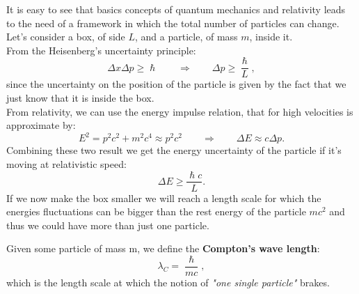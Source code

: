 It is easy to see that basics concepts of quantum mechanics and relativity leads to the need of a framework in which the total number of particles can change.\\Let's consider a box, of side $L$, and a particle, of mass $m$, inside it.\\From the Heisenberg's uncertainty principle:
\begin{equation*}
    \Delta x\Delta p\geq\hslash\qquad\Rightarrow\qquad\Delta p\geq\frac{\hslash}{L},
\end{equation*}
since the uncertainty on the position of the particle is given by the fact that we just know that it is inside the box.\\From relativity, we can use the energy impulse relation, that for high velocities is approximate by:
\begin{equation*}
    E^2=p^2c^2+m^2c^4\approx p^2c^2\qquad \Rightarrow \qquad \Delta E\approx c\Delta p.
\end{equation*}
Combining these two result we get the energy uncertainty of the particle if it's moving at relativistic speed:
\begin{equation*}
    \Delta E \geq \frac{\hslash c}{L}.
\end{equation*}
If we now make the box smaller we will reach a length scale for which the energies fluctuations can be bigger than the rest energy of the particle $mc^2$ and thus we could have more than just one particle.
\begin{definition}
    Given some particle of mass m, we define the \textbf{Compton's wave length}:
    \begin{equation}
        \label{Compton'sWL} \lambda_C=\frac{\hslash}{mc},
    \end{equation}
    which is the length scale at which the notion of \emph{"one single particle"} brakes.
\end{definition}
\vspace{.5cm}

